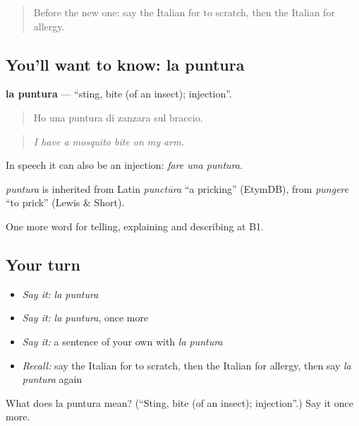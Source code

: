\label{lesson:IT-C486-puntura}



\begin{quote}
Before the new one: say the Italian for to scratch, then the Italian for allergy.
\end{quote}

\subsection*{You'll want to know: la puntura}
\textbf{la puntura} — \textquotedblleft{}sting, bite (of an insect); injection\textquotedblright{}.

\begin{quote}
Ho una puntura di zanzara sul braccio.
\end{quote}

\begin{quote}
\emph{I have a mosquito bite on my arm.}
\end{quote}

In speech it can also be an injection: \emph{fare una puntura}.

\begin{cousinweb}
\emph{puntura} is inherited from Latin \emph{punctūra} \textquotedblleft{}a pricking\textquotedblright{} (EtymDB), from \emph{pungere} \textquotedblleft{}to prick\textquotedblright{} (Lewis \& Short).
\end{cousinweb}

\begin{grammarlens}[title={What you've built}]
One more word for telling, explaining and describing at B1.
\end{grammarlens}

\subsection*{Your turn}
\begin{itemize}
\raggedright
  \item \emph{Say it:} \emph{la puntura}
  \item \emph{Say it:} \emph{la puntura}, once more
  \item \emph{Say it:} a sentence of your own with \emph{la puntura}
  \item \emph{Recall:} say the Italian for to scratch, then the Italian for allergy, then say \emph{la puntura} again
\end{itemize}

\begin{tcolorbox}[breakable,colback=teal!4,colframe=teal!35!black,title={Before you move on}]
What does la puntura mean? (\textquotedblleft{}Sting, bite (of an insect); injection\textquotedblright{}.) Say it once more.
\end{tcolorbox}
